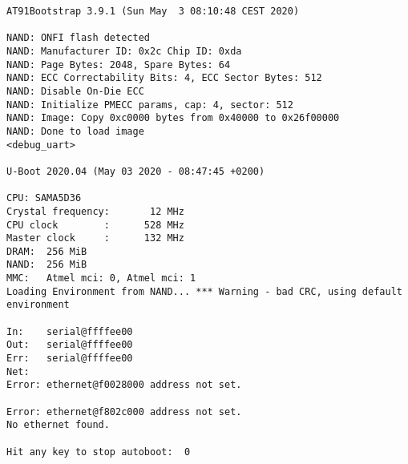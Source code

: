 \begin{verbatim}
AT91Bootstrap 3.9.1 (Sun May  3 08:10:48 CEST 2020)

NAND: ONFI flash detected
NAND: Manufacturer ID: 0x2c Chip ID: 0xda
NAND: Page Bytes: 2048, Spare Bytes: 64
NAND: ECC Correctability Bits: 4, ECC Sector Bytes: 512
NAND: Disable On-Die ECC
NAND: Initialize PMECC params, cap: 4, sector: 512
NAND: Image: Copy 0xc0000 bytes from 0x40000 to 0x26f00000
NAND: Done to load image
<debug_uart> 

U-Boot 2020.04 (May 03 2020 - 08:47:45 +0200)

CPU: SAMA5D36
Crystal frequency:       12 MHz
CPU clock        :      528 MHz
Master clock     :      132 MHz
DRAM:  256 MiB
NAND:  256 MiB
MMC:   Atmel mci: 0, Atmel mci: 1
Loading Environment from NAND... *** Warning - bad CRC, using default environment

In:    serial@ffffee00
Out:   serial@ffffee00
Err:   serial@ffffee00
Net:   
Error: ethernet@f0028000 address not set.

Error: ethernet@f802c000 address not set.
No ethernet found.

Hit any key to stop autoboot:  0 
\end{verbatim}

